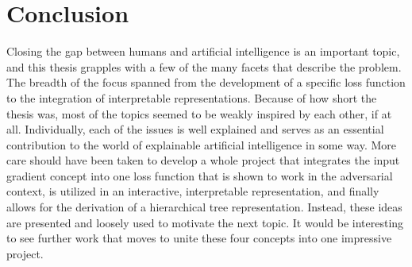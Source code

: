 \documentclass[twoside,11pt]{article}
\begin{document}

\section{Conclusion}
\label{sec:conc}
Closing the gap between humans and artificial intelligence is an important topic, and this thesis grapples with a few of the many facets that describe the problem. The breadth of the focus spanned from the development of a specific loss function to the integration of interpretable representations. Because of how short the thesis was, most of the topics seemed to be weakly inspired by each other, if at all. Individually, each of the issues is well explained and serves as an essential contribution to the world of explainable artificial intelligence in some way. More care should have been taken to develop a whole project that integrates the input gradient concept into one loss function that is shown to work in the adversarial context, is utilized in an interactive, interpretable representation, and finally allows for the derivation of a hierarchical tree representation. Instead, these ideas are presented and loosely used to motivate the next topic. It would be interesting to see further work that moves to unite these four concepts into one impressive project.


\vskip 0.2in

\end{document}
